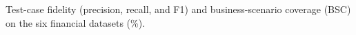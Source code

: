 \begin{table}[!t]
    \setlength{\tabcolsep}{2pt}
    \centering
    \caption{Test-case fidelity (precision, recall, and F1) and business-scenario coverage (BSC) on the six financial datasets (\%).}
    \label{tab:exp1}


    \newcommand{\cc}[1]{%
        \ifdim #1 pt < 60 pt\relax
            #1%
        \else
            \ifdim #1 pt < 90 pt\relax
                \cellcolor{ColorLight}#1%
            \else
                \cellcolor{ColorDark}#1%
            \fi
        \fi
    }

    \newcommand{\ccb}[1]{%
        \ifdim #1 pt < 60 pt\relax
            \textbf{#1}%
        \else
            \ifdim #1 pt < 90 pt\relax
                \cellcolor{ColorLight}\textbf{#1}%
            \else
                \cellcolor{ColorDark}\textbf{#1}%
            \fi
        \fi
    }


\end{table}
